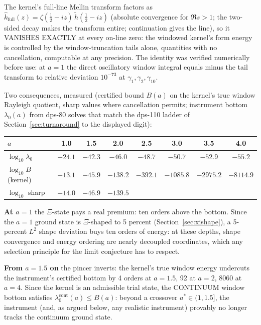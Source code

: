 \documentclass[10pt]{article}
\begin{document}
The kernel's full-line Mellin transform factors as $\hat k_{\mathrm{full}}(z) = \zeta(\tfrac12 - iz)\,\tilde h(\tfrac12 - iz)$ (absolute convergence for $\Re s > 1$; the two-sided decay makes the transform entire; continuation gives the line), so it VANISHES EXACTLY at every on-line zero: the windowed kernel's form energy is controlled by the window-truncation tails alone, quantities with no cancellation, computable at any precision. The identity was verified numerically before use: at $a = 1$ the direct oscillatory window integral equals minus the tail transform to relative deviation $10^{-73}$ at $\gamma_1, \gamma_2, \gamma_{10}$.

Two consequences, measured (certified bound $B(a)$ on the kernel's true window Rayleigh quotient, sharp values where cancellation permits; instrument bottom $\lambda_0(a)$ from dps-80 solves that match the dps-110 ladder of Section~\ref{sec:turnaround} to the displayed digit):

\begin{center}
\small
\setlength{\tabcolsep}{4.5pt}
\begin{tabular}{lccccccc}
\toprule
$a$ & 1.0 & 1.5 & 2.0 & 2.5 & 3.0 & 3.5 & 4.0 \\
\midrule
$\log_{10} \lambda_0$ & $-24.1$ & $-42.3$ & $-46.0$ & $-48.7$ & $-50.7$ & $-52.9$ & $-55.2$ \\
$\log_{10} B$ (kernel) & $-13.1$ & $-45.9$ & $-138.2$ & $-392.1$ & $-1085.8$ & $-2975.2$ & $-8114.9$ \\
$\log_{10}$ sharp & $-14.0$ & $-46.9$ & $-139.5$ & & & & \\
\bottomrule
\end{tabular}
\end{center}

\textbf{At $a = 1$} the $\Xi$-state pays a real premium: ten orders above the bottom. Since the $a = 1$ ground state is $\Xi$-shaped to 5 percent (Section~\ref{sec:xishape}), a 5-percent $L^2$ shape deviation buys ten orders of energy: at these depths, shape convergence and energy ordering are nearly decoupled coordinates, which any selection principle for the limit conjecture has to respect.

\textbf{From $a = 1.5$ on} the pincer inverts: the kernel's true window energy undercuts the instrument's certified bottom by 4 orders at $a = 1.5$, 92 at $a = 2$, 8060 at $a = 4$. Since the kernel is an admissible trial state, the CONTINUUM window bottom satisfies $\lambda_0^{\mathrm{cont}}(a) \le B(a)$: beyond a crossover $a^* \in (1, 1.5]$, the instrument (and, as argued below, any realistic instrument) provably no longer tracks the continuum ground state.
\end{document}
